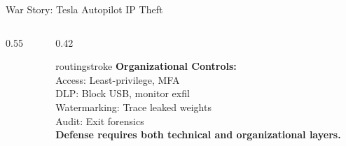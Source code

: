 \documentclass[aspectratio=169, 12pt]{beamer}
\begin{document}
\begin{frame}{War Story: Tesla Autopilot IP Theft}
\begin{columns}[T]
\begin{column}{0.55\textwidth}
    \vspace{0.1cm}
  \end{column}
  \begin{column}{0.42\textwidth}
    \begin{mlsyscard}{routingstroke}
    \textbf{Organizational Controls:}\\[0.05cm]
    {\footnotesize
    Access: Least-privilege, MFA\\
    DLP: Block USB, monitor exfil\\
    Watermarking: Trace leaked weights\\
    Audit: Exit forensics\\[0.1cm]
    \textbf{Defense requires both technical and organizational layers.}}
    \end{mlsyscard}
  \end{column}
\end{columns}

\end{frame}
\end{document}
